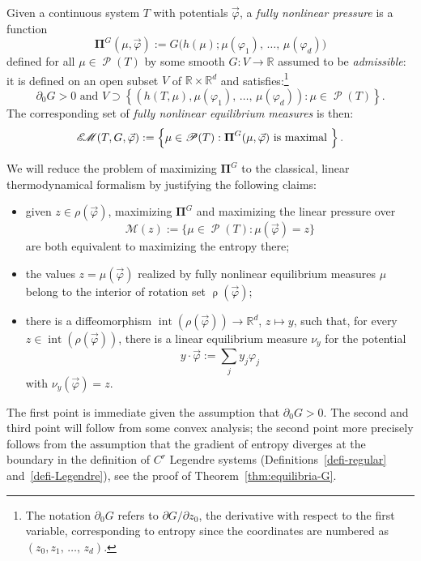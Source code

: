 \documentclass[AHL, Unicode, longabstracts,published]{cedram}
\theoremstyle{plain}
\theoremstyle{plain}
\newcommand\FNLP{\boldsymbol{\Pi}}
\newcommand\vpot{\vec\pot}
\newcommand\Prob{{\operatorname{\mathscr{P}}}}
\newcommand{\rs}{\operatorname{\rho}}
\newcommand{\EM}{\mathscr{E\kern-2pt M}}
\newcommand{\pot}{\varphi}
\newcommand*\8{\infty}
\newcommand\RR{\mathbb{R}}
\newcommand{\cM}{\mathcal{M}}
\begin{document}
\begin{defi}\label{def-fully-nonlin}
Given a continuous system $T$ with potentials $\vpot$, a \emph{fully nonlinear pressure} is a function
\begin{equation}\label{eq-G}
\FNLP^G(\mu,\vpot) := G\big(h(\mu); \mu(\pot_1),\,\dots,\,\mu(\pot_d)\big)
\end{equation}
defined for all $\mu\in\Prob(T)$ {by} some smooth $G:V \to\RR$ assumed to be \emph{admissible}: it is defined on an open subset $V$ of $\RR\times\RR^{d}$ and satisfies:\footnote{The notation $\partial_0G$ refers to $\partial G/\partial z_{0}$, the derivative with respect to the first variable, corresponding to entropy since the coordinates are numbered as $(z_0,z_1,\,\dots,\,z_d)$.}
\[
\partial_0G>0
\text{ and } V\supset\left\{(h(T,\mu),\mu(\pot_1),\,\dots,\,\mu(\pot_d)):\mu\in\Prob(T)\right\}.
\]
The corresponding set of \emph{fully nonlinear equilibrium measures} is then:
\[
\EM(T,G,\vpot) := \left\{\mu\in\Prob(T):\FNLP^G(\mu,\vpot)\text{ is maximal }\right\}.
\]
\end{defi}

We will reduce the problem of maximizing $\FNLP^G$ to the classical, linear thermodynamical formalism by justifying the following claims:
\begin{itemize}
\item[$(\ast)$] given ${z}\in\rho(\vpot)$, maximizing $\FNLP^G$ and maximizing the linear pressure over
\[
\cM(z):=\{\mu\in\Prob(T):\mu(\vpot)= z\}
\]
are both equivalent to maximizing the entropy there;
\item[$(\ast\ast)$] the values $z=\mu(\vpot)$ realized by fully nonlinear equilibrium measures $\mu$ belong to the interior of rotation set $\rs(\vpot)$;
\item[$(\ast\ast\ast)$] there is a diffeomorphism $\operatorname{int}(\rho(\vpot))\to\RR^d$, ${z}\mapsto{y}$, such that, for every ${z}\in\operatorname{int}(\rho(\vpot))$, there is a linear equilibrium measure $\nu_{ y}$ for the potential
\[
{y}\cdot\vpot:=\sum_j y_j\pot_j
\]
with $\nu_y(\vpot)= z$.
\end{itemize}
The first point is immediate given the assumption that $\partial_0 G>0$. The second and third point will follow from some convex analysis; the second point more precisely follows from the assumption that the gradient of entropy diverges at the boundary in the definition of $C^r$ Legendre systems (Definitions~\ref{defi-regular} and~\ref{defi-Legendre}), see the proof of Theorem~\ref{thm:equilibria-G}.
\end{document}
